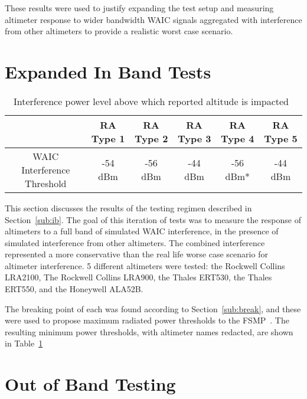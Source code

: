 These results were used to justify expanding the test setup and measuring altimeter response to wider bandwidth WAIC signals aggregated with interference from other altimeters to provide a realistic worst case scenario.

\section{Expanded In Band Tests}\label{sec:dvsg_ib_results}
\begin{table}[]
\begin{tabular}{@{}cccccc@{}}
\toprule
                            & RA Type 1 & RA Type 2 & RA Type 3 & RA Type 4 & RA Type 5 \\ \midrule
WAIC Interference Threshold & -54 dBm   & -56 dBm   & -44 dBm   & -56 dBm*  & -44 dBm   \\ \bottomrule
\end{tabular}
\caption{Interference power level above which reported altitude is impacted~\cite{uwe_radio_2019}}
\label{tab:ib_thresholds_fsmp}
\end{table}

This section discusses the results of the testing regimen described in Section~\ref{sub:ib}. The goal of this iteration of tests was to measure the response of altimeters to a full band of simulated WAIC interference, in the presence of simulated interference from other altimeters. The combined interference represented a more conservative than the real life worse case scenario for altimeter interference. 5 different altimeters were tested: the Rockwell Collins LRA2100, The Rockwell Collins LRA900, the Thales ERT530, the Thales ERT550, and the Honeywell ALA52B.

 The breaking point of each was found according to Section~\ref{sub:break}, and these were used to propose maximum radiated power thresholds to the FSMP~\cite{uwe_radio_2019}. The resulting minimum power thresholds, with altimeter names redacted, are shown in Table~\ref{tab:ib_thresholds_fsmp}


\section{Out of Band Testing}\label{sec:dvsg_oob_results}

%

